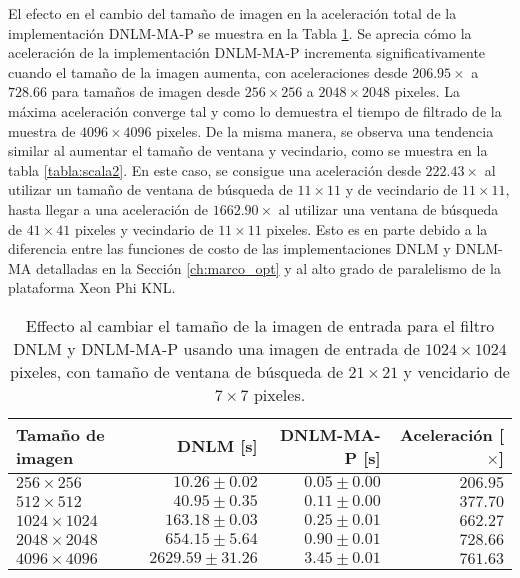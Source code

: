 El efecto en el cambio del tama\~no de imagen en la aceleración total de la implementación DNLM-MA-P se muestra en la Tabla \ref{tabla:scala1}. Se aprecia cómo la aceleración de la implementación DNLM-MA-P incrementa significativamente cuando el tama\~no de la imagen aumenta, con aceleraciones desde $206.95\times$ a $728.66$ para tama\~nos de imagen desde $256 \times 256$ a $2048 \times 2048$ pixeles. La máxima aceleración converge tal y como lo demuestra el tiempo de filtrado de la muestra de $4096\times 4096$ pixeles.  
De la misma manera, se observa una tendencia similar al aumentar el tama\~no de ventana y vecindario, como se muestra en la tabla \ref{tabla:scala2}. En este caso, se consigue una aceleración desde $222.43\times$ al utilizar un tama\~no de ventana de búsqueda de $11 \times 11$ y de vecindario de $11 \times 11$, hasta llegar a una aceleración de $1662.90\times$ al utilizar una ventana de búsqueda de $41 \times 41$ pixeles y vecindario de $11 \times 11$ pixeles. Esto es en parte debido a la diferencia entre las funciones de costo de las implementaciones DNLM y DNLM-MA detalladas en la Sección \ref{ch:marco_opt} y al alto grado de paralelismo de la plataforma Xeon Phi KNL.


\begin{table}
\protect\caption[Efecto al cambiar tama\~no de imagen de entrada]{Effecto al cambiar el tama\~no de la imagen de entrada para el filtro DNLM y DNLM-MA-P usando una imagen de entrada de  $1024 \times 1024$ pixeles, con tama\~no de ventana de búsqueda de $21 \times 21$ y vencidario de $7 \times 7$ pixeles. \label{tabla:scala1}}
\centering
\begin{tabular}{lrrr}
Tama\~no de imagen & DNLM [s]& DNLM-MA-P [s]& Aceleración [$\times$] \tabularnewline
\hline
$256 \times 256$ & $10.26\pm0.02$ & $0.05\pm0.00$ & $206.95$ \tabularnewline
$512 \times 512$ & $40.95\pm0.35$ & $0.11\pm0.00$ & $377.70$ \tabularnewline
$1024 \times 1024$ & $163.18\pm0.03$ & $0.25\pm0.01$ & $662.27$ \tabularnewline
$2048 \times 2048$ & $654.15\pm5.64$ & $0.90\pm0.01$ & $728.66$ \tabularnewline
$4096 \times 4096$ & $2629.59\pm31.26$ & $3.45\pm0.01$ & $761.63$ \tabularnewline
\end{tabular}
\end{table}


